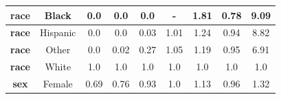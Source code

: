 \documentclass[oneside,openright,titlepage,numbers=noenddot,openany,headinclude,footinclude=true,
cleardoublepage=empty,abstractoff,BCOR=5mm,paper=a4,fontsize=12pt,main=spanish]{scrreprt}
\begin{document}
\begin{table}[h]
{\begin{tabular}{|c|c|c|c|c|c|c|c|c|}
\textbf{race}                                                     & Black                                                              & {\color[HTML]{FE0000} 0.0}                                       & {\color[HTML]{FE0000} 0.0}                                       & {\color[HTML]{FE0000} 0.0}                                       & {-}                                         & {\color[HTML]{FE0000} 1.81}                                      & {\color[HTML]{FE0000} 0.78}                                      & {\color[HTML]{FE0000} 9.09}                                      \\ \hline
\textbf{race}                                                     & Hispanic                                                           & {\color[HTML]{FE0000} 0.0}                                       & {\color[HTML]{FE0000} 0.0}                                       & {\color[HTML]{FE0000} 0.03}                                      & {\color[HTML]{32CB00} 1.01}                                      & {\color[HTML]{32CB00} 1.24}                                      & {\color[HTML]{32CB00} 0.94}                                      & {\color[HTML]{FE0000} 8.82}                                      \\ \hline
\textbf{race}                                                     & Other                                                              & {\color[HTML]{FE0000} 0.0}                                       & {\color[HTML]{FE0000} 0.02}                                      & {\color[HTML]{FE0000} 0.27}                                      & {\color[HTML]{32CB00} 1.05}                                      & {\color[HTML]{32CB00} 1.19}                                      & {\color[HTML]{32CB00} 0.95}                                      & {\color[HTML]{FE0000} 6.91}                                      \\ \hline
\textbf{race}                                                     & White                                                              & {\color[HTML]{3166FF} 1.0}                                       & {\color[HTML]{3166FF} 1.0}                                       & {\color[HTML]{3166FF} 1.0}                                       & {\color[HTML]{3166FF} 1.0}                                       & {\color[HTML]{3166FF} 1.0}                                       & {\color[HTML]{3166FF} 1.0}                                       & {\color[HTML]{3166FF} 1.0}                                       \\ \hline
\textbf{sex}                                                      & Female                                                             & {\color[HTML]{FE0000} 0.69}                                      & {\color[HTML]{FE0000} 0.76}                                      & {\color[HTML]{32CB00} 0.93}                                      & {\color[HTML]{32CB00} 1.0}                                       & {\color[HTML]{32CB00} 1.13}                                      & {\color[HTML]{32CB00} 0.96}                                      & {\color[HTML]{FE0000} 1.32}                                      \\ \hline

\end{tabular}}
\end{table}
\end{document}
